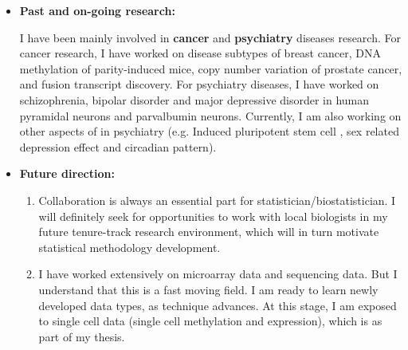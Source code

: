\documentclass[a4paper, 10pt]{article}
\begin{document}
\begin{itemize}
\item \textbf{Past and on-going research:}

I have been mainly involved in \textbf{cancer} and \textbf{psychiatry} diseases research.
For cancer research, I have worked on disease subtypes of breast cancer\cite{ref:ILC},
DNA methylation of parity-induced mice\cite{ref:mouseParity}, 
copy number variation of prostate cancer\cite{ref:prostate},
and fusion transcript discovery\cite{ref:fusionGene}.
For psychiatry diseases,
I have worked on schizophrenia, bipolar disorder and major depressive disorder in human pyramidal neurons\cite{ref:MO1} and parvalbumin neurons\cite{ref:PVL3}.
Currently, I am also working on other aspects of in psychiatry (e.g. Induced pluripotent stem cell \cite{ref:iPSC}, sex related depression effect and circadian pattern).

\item \textbf{Future direction:}
\begin{enumerate}
\item Collaboration is always an essential part for statistician/biostatistician.
I will definitely seek for opportunities to work with local biologists in my future tenure-track research environment, 
which will in turn motivate statistical methodology development.
\item I have worked extensively on microarray data and sequencing data.
But I understand that this is a fast moving field.
I am ready to learn newly developed data types, as technique advances.
At this stage, I am exposed to single cell data (single cell methylation and expression),
which is as part of my thesis.
\end{enumerate}
\end{itemize}
\end{document}

